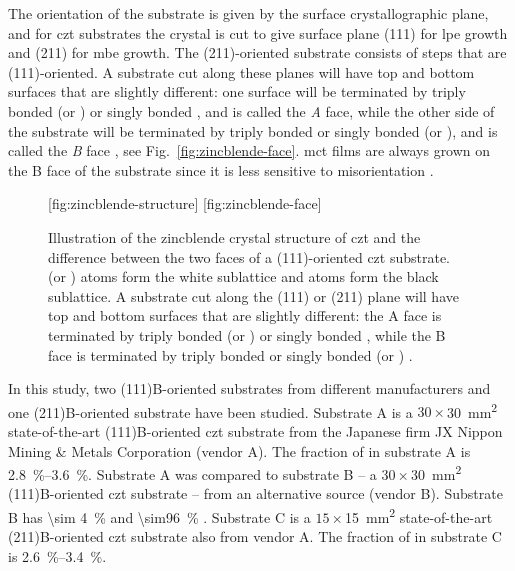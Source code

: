The orientation of the substrate is given by the surface crystallographic plane, and for \ac{czt} substrates the crystal is cut to give surface plane (111) for \ac{lpe} growth and (211) for \ac{mbe} growth. The (211)-oriented substrate consists of steps that are (111)-oriented. A substrate cut along these planes will have top and bottom surfaces that are slightly different: one surface will be terminated by triply bonded  (or ) or singly bonded , and is called the \emph{A} face, while the other side of the substrate will be terminated by triply bonded  or singly bonded  (or ), and is called the \emph{B} face \citep{sivananthan1986relation}, see Fig.~\ref{fig:zincblende-face}. \Ac{mct} films are always grown on the B face of the substrate since it is less sensitive to misorientation \citep{parker1988terracing, edwall1984liquid}.

\begin{figure}[htbp]
    \centering
    [fig:zincblende-structure]
    \quad
    [fig:zincblende-face]
    \caption[Crystal structure of \ac{czt}.]{Illustration of the zincblende crystal structure of \ac{czt} and the difference between the two faces of a (111)-oriented \ac{czt} substrate.  (or ) atoms form the white sublattice and  atoms form the black sublattice. A substrate cut along the (111) or (211) plane will have top and bottom surfaces that are slightly different: the A face is terminated by triply bonded  (or ) or singly bonded , while the B face is terminated by triply bonded  or singly bonded  (or ) \citep[Adapted from][]{sivananthan1986relation}.}
    \label{fig:zincblende}
\end{figure}

In this study, two (111)B-oriented substrates from different manufacturers and one (211)B-oriented substrate have been studied. Substrate A is a $30\times$\SI{30}{\milli\metre^2} state-of-the-art (111)B-oriented \ac{czt} substrate from the Japanese firm JX Nippon Mining \& Metals Corporation (vendor A). The fraction of  in substrate A is \SIrange{2.8}{3.6}{\percent}. Substrate A was compared to substrate B -- a $30\times$\SI{30}{\milli\metre^2} (111)B-oriented \ac{czt} substrate -- from an alternative source (vendor B). Substrate B has \SI{\sim 4}{\percent}  and \SI{\sim96}{\percent} . Substrate C is a $15\times$\SI{15}{\milli\metre^2} state-of-the-art (211)B-oriented \ac{czt} substrate also from vendor A. The fraction of  in substrate C is \SIrange{2.6}{3.4}{\percent}. %

